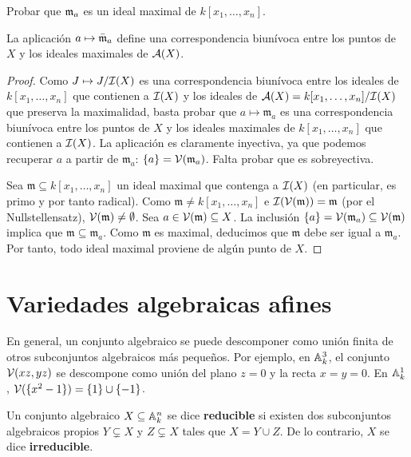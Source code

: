 \documentclass[ACGA.tex]{subfiles}
\begin{document}
\begin{ejer}
 Probar que ${\mathfrak{m}}_a$ es un ideal maximal de $k[x_1,\ldots,x_n]$.
\end{ejer}

\begin{prop}\label{maximal}
 La aplicación $a\mapsto \bar{{\mathfrak{m}}}_a$ define una correspondencia biunívoca entre los puntos de $X$ y los ideales maximales de ${\mathcal A}(X)$.
\end{prop}

\begin{proof}
 Como $J\mapsto J/\mathcal{I}(X)$ es una correspondencia biunívoca entre los ideales de $k[x_1,\ldots,x_n]$ que contienen a $\mathcal{I}(X)$ y los ideales de ${\mathcal A}(X)=k[x_1,\ldots,x_n]/\mathcal{I}(X)$ que preserva la maximalidad, basta probar que $a\mapsto{\mathfrak m}_a$ es una correspondencia biunívoca entre los puntos de $X$ y los ideales maximales de $k[x_1,\ldots,x_n]$ que contienen a $\mathcal{I}(X)$. La aplicación es claramente inyectiva, ya que podemos recuperar $a$ a partir de ${\mathfrak m}_a$: $\{a\}=\mathcal{V}({\mathfrak m}_a)$. Falta probar que es sobreyectiva.

 Sea ${\mathfrak m}\subseteq k[x_1,\ldots,x_n]$ un ideal maximal que contenga a $\mathcal{I}(X)$ (en particular, es primo y por tanto radical). Como ${\mathfrak m}\neq k[x_1,\ldots,x_n]$ e $\mathcal{I}(\mathcal{V}({\mathfrak m}))=\mathfrak m$ (por el Nullstellensatz), $\mathcal{V}({\mathfrak m})\neq\emptyset$. Sea $a\in \mathcal{V}({\mathfrak m})\subseteq X$. La inclusión $\{a\}=\mathcal{V}({\mathfrak m}_a)\subseteq \mathcal{V}({\mathfrak m})$ implica que ${\mathfrak m}\subseteq{\mathfrak m}_a$. Como ${\mathfrak m}$ es maximal, deducimos que ${\mathfrak m}$ debe ser igual a ${\mathfrak m}_a$. Por tanto, todo ideal maximal proviene de algún punto de $X$.
\end{proof}





\section{Variedades algebraicas afines}

En general, un conjunto algebraico se puede descomponer como unión finita de otros subconjuntos algebraicos más pequeños. Por ejemplo, en $\mathbb{A}^3_k$, el conjunto $\mathcal{V}({xz,yz})$ se descompone como unión del plano $z=0$ y la recta $x=y=0$. En $\mathbb{A}^1_k$, $\mathcal{V}(\{x^2-1\})=\{1\}\cup\{-1\}$.

\begin{defi}
 Un conjunto algebraico $X\subseteq \mathbb{A}^n_k$ se dice {\bf reducible} si existen dos subconjuntos algebraicos propios $Y\subsetneq X$ y $Z\subsetneq X$ tales que $X=Y\cup Z$. De lo contrario, $X$ se dice {\bf irreducible}.
\end{defi}
\end{document}
